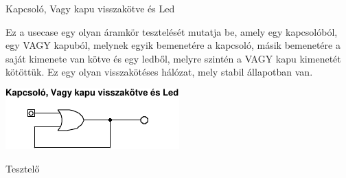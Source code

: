 \usecase
{Kapcsoló, Vagy kapu visszakötve és Led}
{Ez a usecase egy olyan áramkör tesztelését mutatja be, amely egy kapcsolóból, egy VAGY kapuból, melynek egyik bemenetére a kapcsoló, másik bemenetére a saját kimenete van kötve és egy ledből, melyre szintén a VAGY kapu kimenetét kötöttük. Ez egy olyan visszakötéses hálózat, mely stabil állapotban van.
\newline
\begin{center}
\vspace{-15pt}
\includegraphics[scale=1.5]{dw/circuit_test5.pdf}
\vspace{-10pt}
\end{center}}
{Tesztelő}
